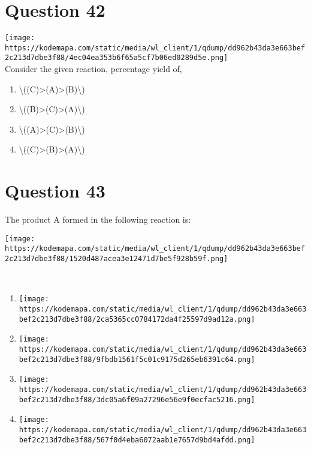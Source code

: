 \documentclass{article}
\begin{document}
\section*{Question 42}
\texttt{[image: https://kodemapa.com/static/media/wl\_client/1/qdump/dd962b43da3e663bef2c213d7dbe3f88/4ec04ea353b6f65a5cf7b06ed0289d5e.png]}\\



Consider the given reaction, percentage yield of,~


\begin{enumerate}[label=(\alph*)]
\item \textbackslash((C)\textgreater(A)\textgreater(B)\textbackslash)


\item \textbackslash((B)\textgreater(C)\textgreater(A)\textbackslash)


\item \textbackslash((A)\textgreater(C)\textgreater(B)\textbackslash)


\item \textbackslash((C)\textgreater(B)\textgreater(A)\textbackslash)


\end{enumerate}
\newpage
\section*{Question 43}
The product A formed in the following reaction is:



\texttt{[image: https://kodemapa.com/static/media/wl\_client/1/qdump/dd962b43da3e663bef2c213d7dbe3f88/1520d487acea3e12471d7be5f928b59f.png]}\\



{}\strut \\


\begin{enumerate}[label=(\alph*)]
\item \texttt{[image: https://kodemapa.com/static/media/wl\_client/1/qdump/dd962b43da3e663bef2c213d7dbe3f88/2ca5365cc0784172da4f25597d9ad12a.png]}


\item \texttt{[image: https://kodemapa.com/static/media/wl\_client/1/qdump/dd962b43da3e663bef2c213d7dbe3f88/9fbdb1561f5c01c9175d265eb6391c64.png]}


\item \texttt{[image: https://kodemapa.com/static/media/wl\_client/1/qdump/dd962b43da3e663bef2c213d7dbe3f88/3dc05a6f09a27296e56e9f0ecfac5216.png]}


\item \texttt{[image: https://kodemapa.com/static/media/wl\_client/1/qdump/dd962b43da3e663bef2c213d7dbe3f88/567f0d4eba6072aab1e7657d9bd4afdd.png]}


\end{enumerate}
\newpage
\end{document}
